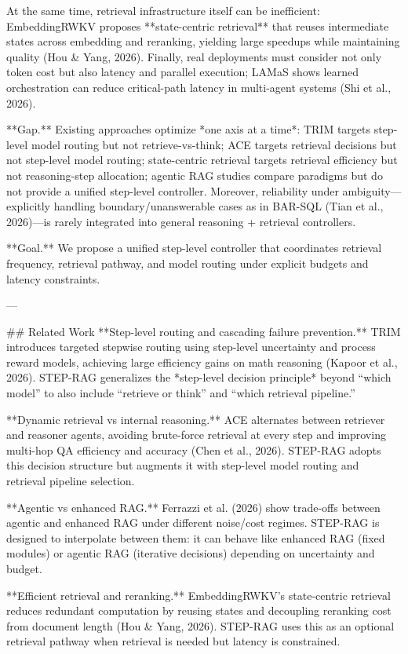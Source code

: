 At the same time, retrieval infrastructure itself can be inefficient: EmbeddingRWKV proposes **state-centric retrieval** that reuses intermediate states across embedding and reranking, yielding large speedups while maintaining quality (Hou & Yang, 2026). Finally, real deployments must consider not only token cost but also latency and parallel execution; LAMaS shows learned orchestration can reduce critical-path latency in multi-agent systems (Shi et al., 2026).  

**Gap.** Existing approaches optimize *one axis at a time*: TRIM targets step-level model routing but not retrieve-vs-think; ACE targets retrieval decisions but not step-level model routing; state-centric retrieval targets retrieval efficiency but not reasoning-step allocation; agentic RAG studies compare paradigms but do not provide a unified step-level controller. Moreover, reliability under ambiguity—explicitly handling boundary/unanswerable cases as in BAR-SQL (Tian et al., 2026)—is rarely integrated into general reasoning + retrieval controllers.

**Goal.** We propose a unified step-level controller that coordinates retrieval frequency, retrieval pathway, and model routing under explicit budgets and latency constraints.

---

## Related Work  
**Step-level routing and cascading failure prevention.** TRIM introduces targeted stepwise routing using step-level uncertainty and process reward models, achieving large efficiency gains on math reasoning (Kapoor et al., 2026). STEP-RAG generalizes the *step-level decision principle* beyond “which model” to also include “retrieve or think” and “which retrieval pipeline.”

**Dynamic retrieval vs internal reasoning.** ACE alternates between retriever and reasoner agents, avoiding brute-force retrieval at every step and improving multi-hop QA efficiency and accuracy (Chen et al., 2026). STEP-RAG adopts this decision structure but augments it with step-level model routing and retrieval pipeline selection.

**Agentic vs enhanced RAG.** Ferrazzi et al. (2026) show trade-offs between agentic and enhanced RAG under different noise/cost regimes. STEP-RAG is designed to interpolate between them: it can behave like enhanced RAG (fixed modules) or agentic RAG (iterative decisions) depending on uncertainty and budget.

**Efficient retrieval and reranking.** EmbeddingRWKV’s state-centric retrieval reduces redundant computation by reusing states and decoupling reranking cost from document length (Hou & Yang, 2026). STEP-RAG uses this as an optional retrieval pathway when retrieval is needed but latency is constrained.

